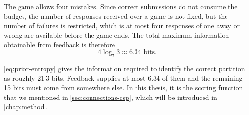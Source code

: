 The game allows four mistakes. Since correct submissions do not consume the budget, the number of responses received over a game is not fixed, but the number of failures is restricted, which is at most four responses of one away or wrong are available before the game ends. The total maximum information obtainable from feedback is therefore
\begin{equation}
4 \log_2 3 \approx 6.34 \text{ bits}.
\label{eq:feedback-bound}
\end{equation}

\autoref{eq:prior-entropy} gives the information required to identify the correct partition as roughly 21.3 bits. Feedback supplies at most 6.34 of them and the remaining 15 bits must come from somewhere else. In this thesis, it is the scoring function that we mentioned in \autoref{sec:connections-csp}, which will be introduced in \autoref{chap:method}.